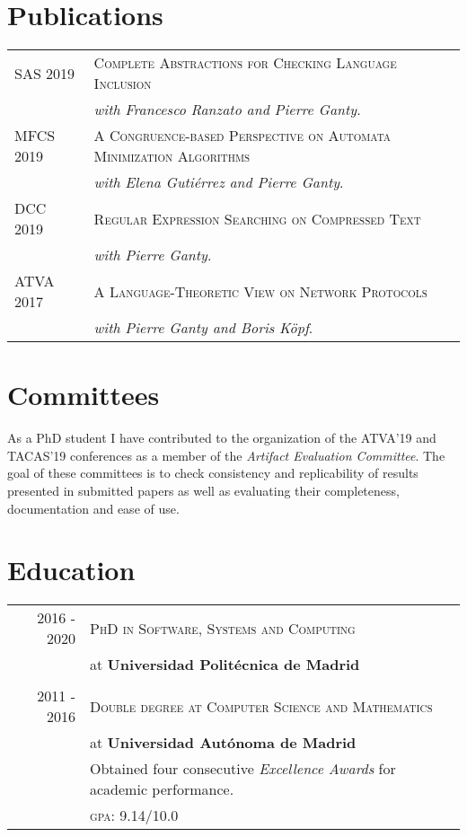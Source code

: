 \documentclass[a4paper,10pt]{article} %
\begin{document}
\section{Publications}
\begin{tabular}{p{2.6cm}p{12.5cm}}
\textsc{SAS} 2019 & \textsc{Complete Abstractions for Checking Language Inclusion} \\
& \textit{with Francesco Ranzato and Pierre Ganty}. \\
\textsc{MFCS} 2019 & \textsc{A Congruence-based Perspective on Automata Minimization Algorithms} \\
 & \textit{with Elena Gutiérrez and Pierre Ganty}. \\
\textsc{DCC} 2019 & \textsc{Regular Expression Searching on Compressed Text} \\
 & \textit{with Pierre Ganty}. \\
\textsc{ATVA} 2017 & \textsc{A Language-Theoretic View on Network Protocols} \\
& \textit{with Pierre Ganty and Boris Köpf}. \\
\end{tabular}

\section{Committees}
As a PhD student I have contributed to the organization of the \textsc{ATVA'19} and \textsc{TACAS'19} conferences as a member of the \emph{Artifact Evaluation Committee}. 
The goal of these committees is to check consistency and replicability of results presented in submitted papers as well as evaluating their completeness, documentation and ease of use.

\section{Education}
\begin{tabular}{rl}
2016 - 2020 & \textsc{PhD in Software, Systems and Computing} \\
& at \textbf{Universidad Politécnica de Madrid}\\
\\
2011 - 2016 & \textsc{Double degree at Computer Science and Mathematics}\\
& at \textbf{Universidad Autónoma de Madrid} \\
& Obtained four consecutive \emph{Excellence Awards} for academic performance. \\
& \normalsize \textsc{gpa}: 9.14/10.0
\end{tabular}
\end{document}
